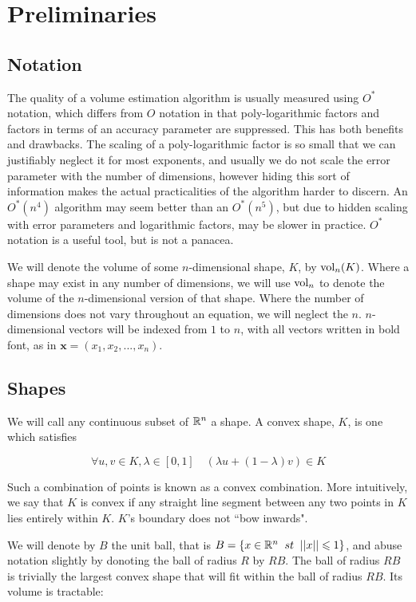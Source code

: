 \section{Preliminaries}
\subsection{Notation}

The quality of a volume estimation algorithm is usually measured using $O^{*}$ notation, which differs from $O$ notation in that poly-logarithmic factors and factors in terms of an accuracy parameter are suppressed. This has both benefits and drawbacks. The scaling of a poly-logarithmic factor is so small that we can justifiably neglect it for most exponents, and usually we do not scale the error parameter with the number of dimensions, however hiding this sort of information makes the actual practicalities of the algorithm harder to discern. An $O^{*}(n^4)$ algorithm may seem better than an $O^{*}(n^5)$, but due to hidden scaling with error parameters and logarithmic factors, may be slower in practice. $O^{*}$ notation is a useful tool, but is not a panacea.

We will denote the volume of some $n$-dimensional shape, $K$, by $\mbox{vol}_n(K)$. Where a shape may exist in any number of dimensions, we will use $\mbox{vol}_n$ to denote the volume of the $n$-dimensional version of that shape. Where the number of dimensions does not vary throughout an equation, we will neglect the $n$. $n$-dimensional vectors will be indexed from $1$ to $n$, with all vectors written in bold font, as in ${\bm x} = (x_1, x_2, ..., x_n)$.

\subsection{Shapes}

We will call any continuous subset of $\mathbb{R}^{n}$ a shape. A convex shape, $K$, is one which satisfies

$$
\forall u, v \in K, \lambda \in [0,1] \quad (\lambda u + (1-\lambda) v) \in K
$$

Such a combination of points is known as a convex combination. More intuitively, we say that $K$ is convex if any straight line segment between any two points in $K$ lies entirely within $K$. $K$'s boundary does not ``bow inwards".

We will denote by $B$ the unit ball, that is $B = \{x \in \mathbb{R}^n \;\; st \;\; ||x|| \leqslant 1\}$, and abuse notation slightly by donoting the ball of radius $R$ by $RB$. The ball of radius $RB$ is trivially the largest convex shape that will fit within the ball of radius $RB$. Its volume is tractable:

